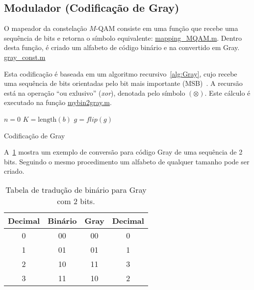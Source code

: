 \subsection{Modulador (Codificação de Gray)}
O mapeador da constelação $M$-QAM consiste em uma função  que recebe uma sequência de bits e retorna o símbolo equivalente: \href{https://raw.githubusercontent.com/lucasabdalah/Courses-HWs/SCD/Sistemas%20de%20Comunicacoes%20Digitais/matlab/problema1/mapping_MQAM.m}{mapping\_MQAM.m}. Dentro desta função, é criado um alfabeto de código binário e na convertido em Gray. \href{https://raw.githubusercontent.com/lucasabdalah/Courses-HWs/SCD/Sistemas%20de%20Comunicacoes%20Digitais/matlab/gray_const.m}{gray\_const.m} 

Esta codificação é baseada em um algoritmo recursivo~\ref{alg:Gray}, cujo recebe uma sequência de bits orientadas pelo bit mais importante (MSB)~\cite{Gray}. A recursão está na operação ``ou exlusivo'' (\textit{xor}), denotada pelo símbolo $(\otimes)$. Este cálculo é executado na função \href{https://raw.githubusercontent.com/lucasabdalah/Courses-HWs/SCD/Sistemas%20de%20Comunicacoes%20Digitais/matlab/mybin2gray.m}{mybin2gray.m}.


\begin{algorithm}[!ht]
    \SetAlgoLined
    $n = 0$\;
    $K = \text{length}(b)$\;
    $g = flip(g)$\;
    \caption{Codificação de Gray}
    \label{alg:Gray}
\end{algorithm}

\clearpage

A~\ref{tab:Alfabeto_Gray} mostra um exemplo de conversão para código Gray de uma sequência de 2 bits. Seguindo o mesmo procedimento um alfabeto de qualquer tamanho pode ser criado.

\begin{table}[!ht]
    \centering
    \begin{tabular}{|c|c|c|c|}
        \hline
        Decimal & Binário & Gray & Decimal \\ \hline
        0 & 00 & 00 & 0\\ \hline
        1 & 01 & 01 & 1\\ \hline
        2 & 10 & 11 & 3\\ \hline
        3 & 11 & 10 & 2\\ \hline
    \end{tabular}
    \caption{Tabela de tradução de binário para Gray com 2 bits.}
    \label{tab:Alfabeto_Gray}
\end{table}

